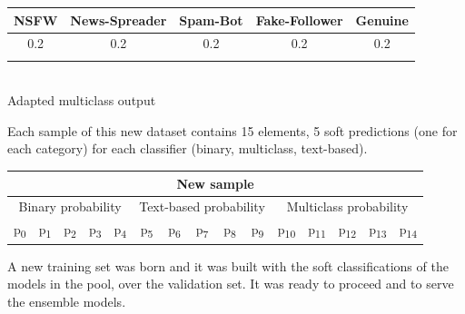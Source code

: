 \begin{center}
	\begin{tabular}{ccccc}
		\\NSFW&News-Spreader&Spam-Bot&Fake-Follower&Genuine\\
		\hline
		0.2&0.2&0.2&0.2&0.2\\
		\hline\\
	\end{tabular}\\
Adapted multiclass output
\end{center}

Each sample of this new dataset contains 15 elements, 5 soft predictions (one for each category) for each classifier (binary, multiclass, text-based).
\begin{center}
	\begin{tabular}{@{}c|c|c|c|c|c|c|c|c|c|c|c|c|c|c@{}}
		\multicolumn{15}{c}{New sample} \\
		\hline
		\multicolumn{5}{c|}{Binary probability} & 
		\multicolumn{5}{c|}{Text-based probability} & 
		\multicolumn{5}{c}{Multiclass probability}\\
		\hline
		p\textsubscript{0} &
		p\textsubscript{1} &
		p\textsubscript{2} &
		p\textsubscript{3} &
		p\textsubscript{4} &
		p\textsubscript{5} &
		p\textsubscript{6} &
		p\textsubscript{7} &
		p\textsubscript{8} &
		p\textsubscript{9} &
		p\textsubscript{10} &
		p\textsubscript{11} &
		p\textsubscript{12} &
		p\textsubscript{13} &
		p\textsubscript{14}\\
		\hline
	\end{tabular}
\end{center}
A new training set was born and it was built with the soft classifications of the models in the pool, over the validation set. It was ready to proceed and to serve the ensemble models.

